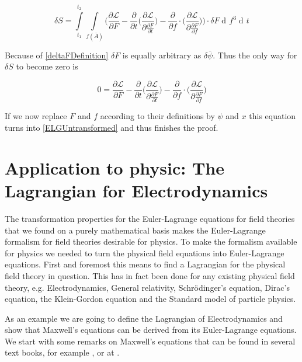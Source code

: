\documentclass{article}
\DeclareMathOperator{\dd}{d\!}
\begin{document}
\begin{equation}
\delta S = \int\limits_{t_1}^{t_2} \int\limits_{f(\bar{A})} 
\bigg(
\frac{\partial \mathcal{L}}{\partial F}
-\frac{\partial}{\partial t} \bigg( \frac{\partial \mathcal{L}}{\partial \frac{\partial F}{\partial t}} \bigg) 
-\frac{\partial}{\partial f} \cdot \bigg( \frac{\partial \mathcal{L}}{\partial \frac{\partial F}{\partial f}} \bigg)\bigg) \cdot \delta F
\dd f^3 \dd t
\end{equation}

Because of \ref{deltaFDefinition} $\delta F$ is equally arbitrary as $\delta \bar{\psi}$. Thus the only way for $\delta S$ to become zero is

\begin{equation}
0 = 
\frac{\partial \mathcal{L}}{\partial F}
-\frac{\partial}{\partial t} \bigg( \frac{\partial \mathcal{L}}{\partial \frac{\partial F}{\partial t}} \bigg) 
-\frac{\partial}{\partial f} \cdot \bigg( \frac{\partial \mathcal{L}}{\partial \frac{\partial F}{\partial f}} \bigg)
\end{equation}

If we now replace $F$ and $f$ according to their definitions by $\psi$ and $x$ this equation turns into \ref{ELGUntransformed} and thus finishes the proof.




\section{Application to physic: The Lagrangian for Electrodynamics}
The transformation properties for the Euler-Lagrange equations for field theories that we found on a purely mathematical basis makes the Euler-Lagrange formalism for field theories desirable for physics. To make the formalism available for physics we needed to turn the physical field equations into Euler-Lagrange equations. First and foremost this means to find a Lagrangian for the physical field theory in question. This has in fact been done for any existing physical field theory, e.g. Electrodynamics, General relativity, Schr\"odinger's equation, Dirac's equation, the Klein-Gordon equation and the Standard model of particle physics.

As an example we are going to define the Lagrangian of Electrodynamics and show that Maxwell's equations can be derived from its Euler-Lagrange equations. We start with some remarks on Maxwell's equations that can be found in several text books, for example \cite{Jackson}, or at \cite{Stackexchange}.
\end{document}
